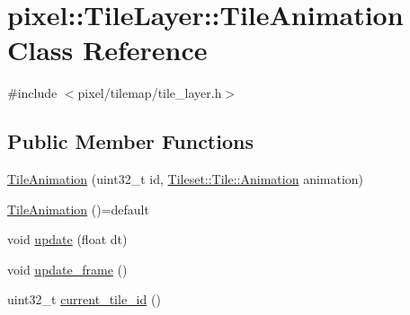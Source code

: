 \hypertarget{classpixel_1_1_tile_layer_1_1_tile_animation}{}\section{pixel\+:\+:Tile\+Layer\+:\+:Tile\+Animation Class Reference}
\label{classpixel_1_1_tile_layer_1_1_tile_animation}


{\ttfamily \#include $<$pixel/tilemap/tile\+\_\+layer.\+h$>$}

\subsection*{Public Member Functions}
\begin{DoxyCompactItemize}
\item 
\hyperlink{classpixel_1_1_tile_layer_1_1_tile_animation_a3a55d9218302b7aa924052612db0f048}{Tile\+Animation} (uint32\+\_\+t id, \hyperlink{structpixel_1_1_tileset_1_1_tile_1_1_animation}{Tileset\+::\+Tile\+::\+Animation} animation)
\item 
\hyperlink{classpixel_1_1_tile_layer_1_1_tile_animation_aae2ce4f9184de17866f094ad43ce980a}{Tile\+Animation} ()=default
\item 
void \hyperlink{classpixel_1_1_tile_layer_1_1_tile_animation_ac667992b85e3014efb3497302bfdef7f}{update} (float dt)
\item 
void \hyperlink{classpixel_1_1_tile_layer_1_1_tile_animation_a283c02cc0f0878db07c16ae601ea74bc}{update\+\_\+frame} ()
\item 
uint32\+\_\+t \hyperlink{classpixel_1_1_tile_layer_1_1_tile_animation_a30537e1452f40ebd8a67370e425714c2}{current\+\_\+tile\+\_\+id} ()
\end{DoxyCompactItemize}
